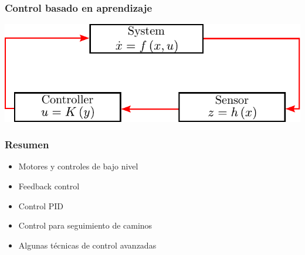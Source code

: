 \begin{frame}
    \frametitle{Control basado en aprendizaje}
    
    \begin{center}
        \includegraphics[width=0.7\columnwidth]{./images/learning_based_control.pdf}
    \end{center}
   
\end{frame}

\begin{frame}
    \frametitle{Resumen}
    
    \begin{itemize}
        \item Motores y controles de bajo nivel
        \item Feedback control
        \item Control PID
        \item Control para seguimiento de caminos
        \item Algunas técnicas de control avanzadas
    \end{itemize}
    
\end{frame}




